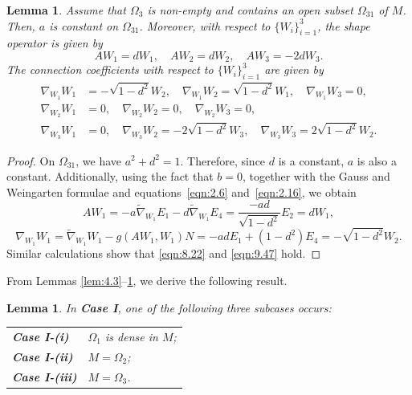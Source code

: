 \documentclass[reqno]{amsart}%
\newtheorem{lemma}[theorem]{Lemma}
\theoremstyle{definition}
\numberwithin{equation}{section}
\begin{document}
	\begin{lemma}\label{lem:4.46}
		Assume that $\Omega_3$ is non-empty and contains an open subset $\Omega_{31}$ of $M$.
		Then, $a$ is constant on $\Omega_{31}$. 
		Moreover, with respect to $\{W_i\}_{i=1}^3$,
		the shape operator is given by
		\begin{equation}\label{eqn:8.22}
			AW_1=dW_1, \quad AW_2=dW_2, \quad AW_3=-2dW_3.
		\end{equation}
		The connection coefficients with respect to $\{W_i\}_{i=1}^3$ are given by
		\begin{equation}\label{eqn:9.47}
			\begin{aligned}
				\nabla_{W_1}W_1&=-\sqrt{1-d^2}W_2, \quad \nabla_{W_1}W_2=\sqrt{1-d^2}W_1, \quad \nabla_{W_1}W_3=0,\\
				\nabla_{W_2}W_1&=0, \quad \nabla_{W_2}W_2=0, \quad \nabla_{W_2}W_3=0,\\
				\nabla_{W_3}W_1&=0, \quad \nabla_{W_3}W_2=-2\sqrt{1-d^2}W_3, \quad \nabla_{W_3}W_3=2\sqrt{1-d^2}W_2.
			\end{aligned}
		\end{equation}
	\end{lemma}
	
	\begin{proof}
		On $\Omega_{31}$, we have $a^2+d^2=1$.
		Therefore, since $d$ is a constant, $a$ is also a constant. Additionally,
		using the fact that $b=0$, together with the Gauss and Weingarten formulae and  equations~\eqref{eqn:2.6}   and~\eqref{eqn:2.16}, we obtain
		\begin{equation*}
			AW_1
			=-a\tilde{\nabla}_{W_1}E_1-d\tilde{\nabla}_{W_1}E_4
			=\frac{-ad}{\sqrt{1-d^2}}E_2=dW_1,
		\end{equation*}
		\begin{equation*}
			\nabla_{W_1}W_1=\tilde{\nabla}_{W_1}W_1-g(AW_1,W_1)N
			=-adE_1+(1-d^2)E_4=-\sqrt{1-d^2}W_2.
		\end{equation*}
		Similar calculations show that
		\eqref{eqn:8.22} and \eqref{eqn:9.47} hold.
	\end{proof}
	
	From Lemmas \ref{lem:4.3}--\ref{lem:4.46}, we derive the following result.
	\begin{lemma}\label{lem:4.47}
		In {\bf Case I}, one of the following three subcases occurs:
		\vspace*{1ex}
		
		\begin{tabular}{l l}
			{\bf Case I-(i)} & $\Omega_1$ is dense in $M$; \\
			{\bf Case I-(ii)} & $M=\Omega_2$; \\
			{\bf Case I-(iii)} & $M=\Omega_3$.
		\end{tabular}
	\end{lemma}
	
\end{document}
